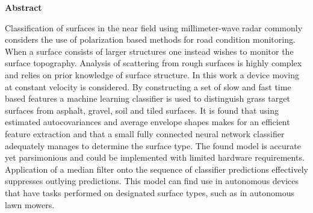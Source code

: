 \newenvironment{abstract}%
    {\cleardoublepage\thispagestyle{empty}\null\vfill\begin{center}%
    \bfseries{\textsf{Abstract}}\end{center}}%
    {\vfill\null}
\begin{abstract}
Classification of surfaces in the near field using millimeter-wave radar commonly considers the use of polarization based methods for road condition monitoring. When a surface consists of larger structures one instead wishes to monitor the surface topography. Analysis of scattering from rough surfaces is highly complex and relies on prior knowledge of surface structure. In this work a device moving at constant velocity is considered. By constructing a set of slow and fast time based features a machine learning classifier is used to distinguish grass target surfaces from asphalt, gravel, soil and tiled surfaces. It is found that using estimated autocovariances and average envelope shapes makes for an efficient feature extraction and that a small fully connected neural network classifier adequately manages to determine the surface type. The found model is accurate yet parsimonious and could be implemented with limited hardware requirements. Application of a median filter onto the sequence of classifier predictions effectively suppresses outlying predictions. This model can find use in autonomous devices that have tasks performed on designated surface types, such as in autonomous lawn mowers. 
	


\end{abstract}
